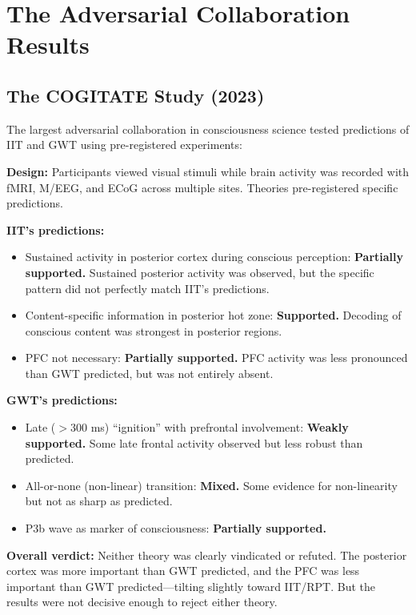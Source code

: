 \documentclass[11pt,a4paper]{report}
\begin{document}
\chapter{The Adversarial Collaboration Results}

\section{The COGITATE Study (2023)}

The largest adversarial collaboration in consciousness science tested predictions of IIT and GWT using pre-registered experiments:

\begin{evidbox}
\textbf{Design:} Participants viewed visual stimuli while brain activity was recorded with fMRI, M/EEG, and ECoG across multiple sites. Theories pre-registered specific predictions.

\textbf{IIT's predictions:}
\begin{itemize}[leftmargin=1.5em]
  \item Sustained activity in posterior cortex during conscious perception: \textbf{Partially supported.} Sustained posterior activity was observed, but the specific pattern did not perfectly match IIT's predictions.
  \item Content-specific information in posterior hot zone: \textbf{Supported.} Decoding of conscious content was strongest in posterior regions.
  \item PFC not necessary: \textbf{Partially supported.} PFC activity was less pronounced than GWT predicted, but was not entirely absent.
\end{itemize}

\textbf{GWT's predictions:}
\begin{itemize}[leftmargin=1.5em]
  \item Late ($>$300 ms) ``ignition'' with prefrontal involvement: \textbf{Weakly supported.} Some late frontal activity observed but less robust than predicted.
  \item All-or-none (non-linear) transition: \textbf{Mixed.} Some evidence for non-linearity but not as sharp as predicted.
  \item P3b wave as marker of consciousness: \textbf{Partially supported.}
\end{itemize}

\textbf{Overall verdict:} Neither theory was clearly vindicated or refuted. The posterior cortex was more important than GWT predicted, and the PFC was less important than GWT predicted---tilting slightly toward IIT/RPT. But the results were not decisive enough to reject either theory.
\end{evidbox}
\end{document}
